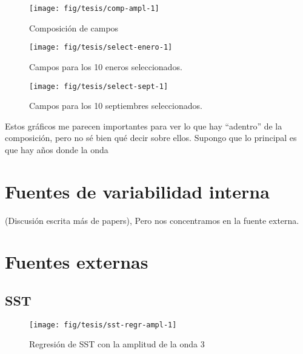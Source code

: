 \documentclass[spanish,a4paper]{book}
\begin{document}
\begin{figure}

{\centering \texttt{[image: fig/tesis/comp-ampl-1]} 

}

\caption{Composición de campos}\label{fig:comp-ampl}
\end{figure}

\begin{figure}

{\centering \texttt{[image: fig/tesis/select-enero-1]} 

}

\caption{Campos para los 10 eneros seleccionados.}\label{fig:select-enero}
\end{figure}

\begin{figure}

{\centering \texttt{[image: fig/tesis/select-sept-1]} 

}

\caption{Campos para los 10 septiembres seleccionados.}\label{fig:select-sept}
\end{figure}

Estos gráficos me parecen importantes para ver lo que hay ``adentro'' de
la composición, pero no sé bien qué decir sobre ellos. Supongo que lo
principal es que hay años donde la onda

\section{Fuentes de variabilidad
interna}\label{fuentes-de-variabilidad-interna}

(Discusión escrita más de papers), Pero nos concentramos en la fuente
externa.

\section{Fuentes externas}\label{fuentes-externas}

\subsection{SST}\label{sst}

\begin{figure}

{\centering \texttt{[image: fig/tesis/sst-regr-ampl-1]} 

}

\caption{Regresión de SST con la amplitud de la onda 3}\label{fig:sst-regr-ampl}
\end{figure}
\end{document}
